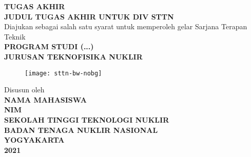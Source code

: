 \begin{titlepage}
	\pagecolor{red}\afterpage{\nopagecolor}
	\thispagestyle{empty}
	\begingroup
	\begin{center}
		\singlespacing
		\textbf{TUGAS AKHIR}\\
		\fontsize{14pt}{1.5em}\selectfont
		\textbf{JUDUL TUGAS AKHIR UNTUK DIV STTN}\\[2cm]
		\fontsize{12pt}{1em}\selectfont
		Diajukan sebagai salah satu syarat untuk memperoleh gelar Sarjana Terapan Teknik\\[2cm]
		\fontsize{12pt}{1em}\selectfont
		\textbf{PROGRAM STUDI (...)}\\
		\textbf{JURUSAN TEKNOFISIKA NUKLIR}\\[2cm]
		
		\begin{figure}[h]
			\centering
			\texttt{[image: sttn-bw-nobg]}
		\end{figure}
		\vspace{2cm}
		
		Disusun oleh\\
		\textbf{NAMA MAHASISWA\\NIM}\\[2cm]
		
		\textbf{SEKOLAH TINGGI TEKNOLOGI NUKLIR\\BADAN TENAGA NUKLIR NASIONAL\\YOGYAKARTA\\2021}
	\end{center}
	\endgroup
\end{titlepage}